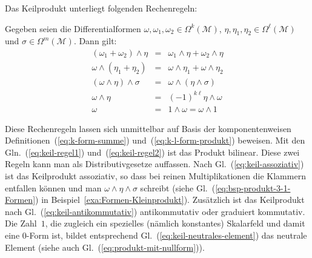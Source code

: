 Das Keilprodukt unterliegt folgenden Rechenregeln:
\begin{proposition}
\label{prop:Keilprodukt}Gegeben seien die Differentialformen $\omega,\omega_{1},\omega_{2}\in\Omega^{k}(\mathcal{M})$,
$\eta,\eta_{1},\eta_{2}\in\Omega^{\ell}(\mathcal{M})$ und $\sigma\in\Omega^{m}(\mathcal{M})$.
Dann gilt:\begin{subequations}
\begin{eqnarray}
\left(\omega_{1}+\omega_{2}\right)\wedge\eta & = & \omega_{1}\wedge\eta+\omega_{2}\wedge\eta\label{eq:keil-regel1}\\
\omega\wedge\left(\eta_{1}+\eta_{2}\right) & = & \omega\wedge\eta_{1}+\omega\wedge\eta_{2}\label{eq:keil-regel2}\\
\left(\omega\wedge\eta\right)\wedge\sigma & = & \omega\wedge\left(\eta\wedge\sigma\right)\label{eq:keil-assoziativ}\\
\omega\wedge\eta & = & (-1)^{k\ell}\eta\wedge\omega\label{eq:keil-antikommutativ}\\
\omega & = & 1\wedge\omega=\omega\wedge1\label{eq:keil-neutrales-element}
\end{eqnarray}
\end{subequations}
\end{proposition}
Diese Rechenregeln lassen sich unmittelbar auf Basis der komponentenweisen
Definitionen~(\ref{eq:k-form-summe}) und~(\ref{eq:k-l-form-produkt})
beweisen. Mit den Gln.~(\ref{eq:keil-regel1}) und~(\ref{eq:keil-regel2})
ist das Produkt bilinear. Diese zwei Regeln kann man als Distributivgesetze
auffassen. Nach Gl.~(\ref{eq:keil-assoziativ}) ist das Keilprodukt
assoziativ, so dass bei reinen Multiplikationen die Klammern entfallen
können und man $\omega\wedge\eta\wedge\sigma$ schreibt (siehe Gl.~(\ref{eq:bsp-produkt-3-1-Formen})
in Beispiel~\ref{exa:Formen-Kleinprodukt}). Zusätzlich ist das Keilprodukt
nach Gl.~(\ref{eq:keil-antikommutativ}) antikommutativ oder graduiert
kommutativ. Die Zahl~$1$, die zugleich ein spezielles (nämlich konstantes)
Skalarfeld und damit eine $0$-Form ist, bildet entsprechend Gl.~(\ref{eq:keil-neutrales-element})
das neutrale Element (siehe auch Gl.~(\ref{eq:produkt-mit-nullform})).


